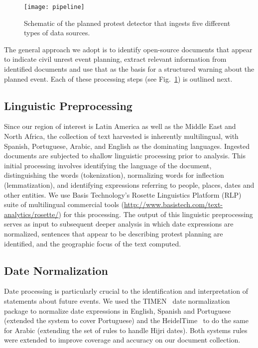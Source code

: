 
\begin{figure}
\texttt{[image: pipeline]}
\caption{Schematic of the planned protest detector that ingests five
different types of data sources.}
\label{flowchart}
\end{figure}
The general approach we adopt is to identify open-source documents that
appear to indicate civil unrest event planning, extract relevant
information from identified documents and use that as the basis for a
structured warning about the planned event. 
Each of these processing steps (see Fig.~\ref{flowchart}) is outlined
next.

\subsection{Linguistic Preprocessing}
Since our region of interest is Latin America as well as the Middle East
and North Africa, the collection of text harvested is inherently
multilingual, with Spanish, Portuguese, Arabic, and English as the
dominating languages. Ingested documents are subjected to shallow
linguistic processing prior to analysis.  This initial processing
involves identifying the language of the document, distinguishing the
words (tokenization), normalizing words for inflection (lemmatization),
and identifying expressions referring to people, places, dates and other
entities.  We use Basis Technology's Rosette Linguistics Platform (RLP)
suite of multilingual commercial tools
(\url{http://www.basistech.com/text-analytics/rosette/}) for this
processing.  The output of this linguistic preprocessing serves as input
to subsequent deeper analysis in which date expressions are normalized,
sentences that appear to be describing protest planning are identified,
and the geographic focus of the text computed.

\subsection{Date Normalization}
Date processing is particularly crucial to the identification and
interpretation of statements about future events. We used the
TIMEN~\cite{LlorensDGS12} date normalization package to normalize date
expressions in English, Spanish and Portuguese (extended the system to
cover Portuguese) and the HeidelTime~\cite{strotgen2014time} to do the
same for Arabic (extending the set of rules to handle Hijri dates).
Both systems rules were extended to improve coverage and accuracy on our
document collection.

